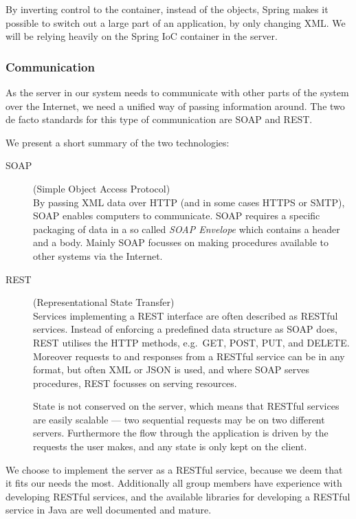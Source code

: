 By inverting control to the container, instead of the objects, Spring makes it possible to switch out a large part of an application, by only changing XML.
We will be relying heavily on the Spring \ac{IoC} container in the server.

\subsubsection{Communication}
\label{subsec:tech_communication}
As the server in our system needs to communicate with other parts of the system over the Internet, we need a unified way of passing information around.
The two de facto standards for this type of communication are SOAP and REST.

We present a short summary of the two technologies:
\begin{description}
    \item[SOAP] (Simple Object Access Protocol)\cite{SOAP_spec}\hfill\\
        By passing XML data over HTTP (and in some cases HTTPS or SMTP), SOAP enables computers to communicate.
        SOAP requires a specific packaging of data in a so called \textit{SOAP Envelope} which contains a header and a body.
        Mainly SOAP focusses on making procedures available to other systems via the Internet.
    \item[REST] (Representational State Transfer)\cite{RESTful_best_practices}\hfill\\
        Services implementing a REST interface are often described as RESTful services.
        Instead of enforcing a predefined data structure as SOAP does, REST utilises the HTTP methods, e.g.~GET, POST, PUT, and DELETE.
        Moreover requests to and responses from a RESTful service can be in any format, but often XML or JSON is used,
        and where SOAP serves procedures, REST focusses on serving resources.

        State is not conserved on the server, which means that RESTful services are easily scalable --- two sequential requests may be on two different servers.
        Furthermore the flow through the application is driven by the requests the user makes, and any state is only kept on the client.
\end{description}

We choose to implement the server as a RESTful service, because we deem that it fits our needs the most.
Additionally all group members have experience with developing RESTful services, and the available libraries for developing a RESTful service in Java are well documented and mature.

